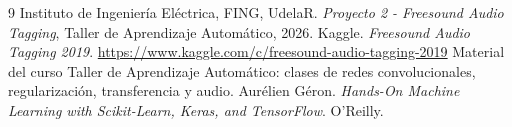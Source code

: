 \documentclass[10pt]{article}
\begin{document}
\begin{thebibliography}{9}
 Instituto de Ingeniería Eléctrica, FING, UdelaR.
\textit{Proyecto 2 - Freesound Audio Tagging}, Taller de Aprendizaje Automático,
2026.
 Kaggle. \textit{Freesound Audio Tagging 2019}.
\url{https://www.kaggle.com/c/freesound-audio-tagging-2019}
 Material del curso Taller de Aprendizaje Automático: clases de
redes convolucionales, regularización, transferencia y audio.
 Aurélien Géron. \textit{Hands-On Machine Learning with
Scikit-Learn, Keras, and TensorFlow}. O'Reilly.
\end{thebibliography}
\end{document}
